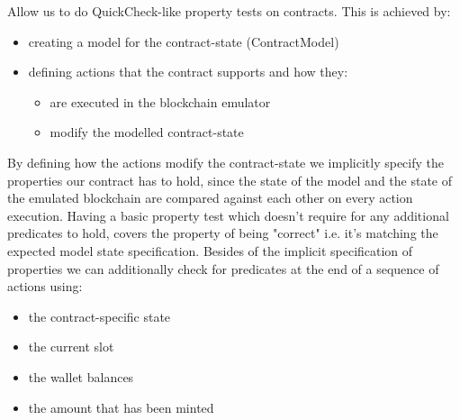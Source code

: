 \documentclass{article}
\begin{document}
\begin{itemize}
    Allow us to do QuickCheck-like property tests on contracts. This is achieved by:
    \begin{itemize}
      \item creating a model for the contract-state (ContractModel)
      \item defining actions that the contract supports and how they:
      \begin{itemize}
        \item are executed in the blockchain emulator 
        \item modify the modelled contract-state
      \end{itemize}
    \end{itemize}
    By defining how the actions modify the contract-state we implicitly specify the properties our contract has to hold,
    since the state of the model and the state of the emulated blockchain are compared against each other on every action execution.
    Having a basic property test which doesn't require for any additional predicates to hold, covers the property of being "correct" i.e. it's matching the
    expected model state specification.
    Besides of the implicit specification of properties we can additionally check for predicates at the end of a sequence of actions using:
    \begin{itemize}
      \item the contract-specific state
      \item the current slot
      \item the wallet balances
      \item the amount that has been minted
    \end{itemize}
    

\end{itemize}
\end{document}
